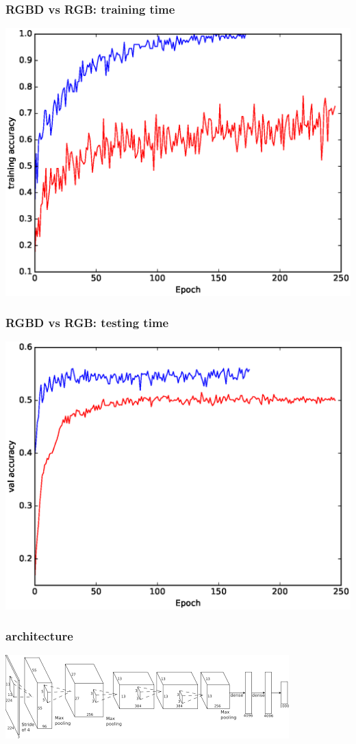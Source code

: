 \documentclass{beamer}
\begin{document}
\begin{frame}
\frametitle{RGBD vs RGB: training time}
\includegraphics[width=\linewidth]{together_train.eps}
\end{frame}


\begin{frame}
\frametitle{RGBD vs RGB: testing time}
\includegraphics[width=\linewidth]{together_test.eps}
\end{frame}

\begin{frame}
\frametitle{architecture}
\includegraphics[width=\linewidth]{alex.png}
\end{frame}
\end{document}
